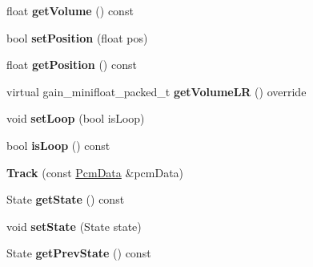 \begin{DoxyCompactItemize}
float {\bfseries get\+Volume} () const
\item 
\mbox{\label{classcocos2d_1_1experimental_1_1Track_a84cde0de42a99cc0dbb3c93bbcad4aa4}} 
bool {\bfseries set\+Position} (float pos)
\item 
\mbox{\label{classcocos2d_1_1experimental_1_1Track_af64db5ace2b78ffd35c2dd0dd81a9bd8}} 
float {\bfseries get\+Position} () const
\item 
\mbox{\label{classcocos2d_1_1experimental_1_1Track_af8409f2114ce03c5d70bcac0bc9d1cc5}} 
virtual gain\+\_\+minifloat\+\_\+packed\+\_\+t {\bfseries get\+Volume\+LR} () override
\item 
\mbox{\label{classcocos2d_1_1experimental_1_1Track_aa98a9abf6870fe0a16cdac2c86981f30}} 
void {\bfseries set\+Loop} (bool is\+Loop)
\item 
\mbox{\label{classcocos2d_1_1experimental_1_1Track_ab0fc62f055a490719e360205a9dfb8e0}} 
bool {\bfseries is\+Loop} () const
\item 
\mbox{\label{classcocos2d_1_1experimental_1_1Track_ad47b8e72382a7c08984c23ea609822e7}} 
{\bfseries Track} (const \hyperlink{structcocos2d_1_1experimental_1_1PcmData}{Pcm\+Data} \&pcm\+Data)
\item 
\mbox{\label{classcocos2d_1_1experimental_1_1Track_afc46cf557d661dd68bc4d883bad7fc23}} 
State {\bfseries get\+State} () const
\item 
\mbox{\label{classcocos2d_1_1experimental_1_1Track_a223fc6b2fc1b06ff3e6f62599d687d75}} 
void {\bfseries set\+State} (State state)
\item 
\mbox{\label{classcocos2d_1_1experimental_1_1Track_a08bb00e4ef28c6213e713874759d2bab}} 
State {\bfseries get\+Prev\+State} () const
\item 
\mbox{\label{classcocos2d_1_1experimental_1_1Track_ac8ec7d777d1478aecce25305611e9155}} 

\end{DoxyCompactItemize}
